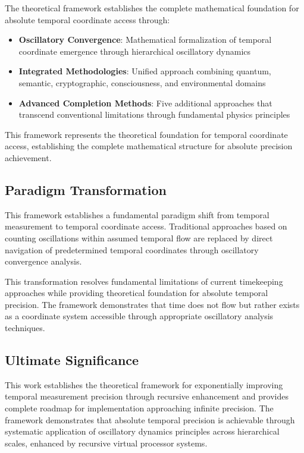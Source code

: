 \documentclass[11pt]{article}
\theoremstyle{remark}
\begin{document}
The theoretical framework establishes the complete mathematical foundation for absolute temporal coordinate access through:

\begin{itemize}
\item \textbf{Oscillatory Convergence}: Mathematical formalization of temporal coordinate emergence through hierarchical oscillatory dynamics
\item \textbf{Integrated Methodologies}: Unified approach combining quantum, semantic, cryptographic, consciousness, and environmental domains
\item \textbf{Advanced Completion Methods}: Five additional approaches that transcend conventional limitations through fundamental physics principles
\end{itemize}

This framework represents the theoretical foundation for temporal coordinate access, establishing the complete mathematical structure for absolute precision achievement.

\subsection{Paradigm Transformation}

This framework establishes a fundamental paradigm shift from temporal measurement to temporal coordinate access. Traditional approaches based on counting oscillations within assumed temporal flow are replaced by direct navigation of predetermined temporal coordinates through oscillatory convergence analysis.

This transformation resolves fundamental limitations of current timekeeping approaches while providing theoretical foundation for absolute temporal precision. The framework demonstrates that time does not flow but rather exists as a coordinate system accessible through appropriate oscillatory analysis techniques.

\subsection{Ultimate Significance}

This work establishes the theoretical framework for exponentially improving temporal measurement precision through recursive enhancement and provides complete roadmap for implementation approaching infinite precision. The framework demonstrates that absolute temporal precision is achievable through systematic application of oscillatory dynamics principles across hierarchical scales, enhanced by recursive virtual processor systems.
\end{document}
